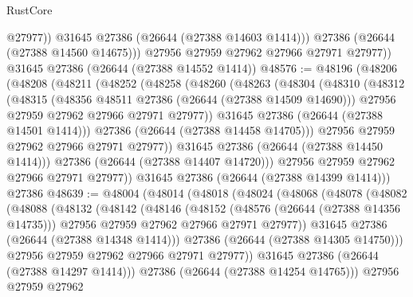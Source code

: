 \begin{lexlean}{RustCore}
\begin{coremodule}
                @27977))
            @31645
            @27386
            (@26644 (@27388 @14603 @1414)))
          @27386
          (@26644 (@27388 @14560 @14675)))
        @27956
        @27959
        @27962
        @27966
        @27971
        @27977))
    @31645
    @27386
    (@26644 (@27388 @14552 @1414))
@48576 := @48196
    (@48206
      (@48208
        (@48211
          (@48252
            (@48258
              (@48260
                (@48263
                  (@48304
                    (@48310
                      (@48312
                        (@48315
                          (@48356 @48511 @27386 (@26644 (@27388 @14509 @14690)))
                          @27956
                          @27959
                          @27962
                          @27966
                          @27971
                          @27977))
                      @31645
                      @27386
                      (@26644 (@27388 @14501 @1414)))
                    @27386
                    (@26644 (@27388 @14458 @14705)))
                  @27956
                  @27959
                  @27962
                  @27966
                  @27971
                  @27977))
              @31645
              @27386
              (@26644 (@27388 @14450 @1414)))
            @27386
            (@26644 (@27388 @14407 @14720)))
          @27956
          @27959
          @27962
          @27966
          @27971
          @27977))
      @31645
      @27386
      (@26644 (@27388 @14399 @1414)))
    @27386
@48639 := @48004
    (@48014
      (@48018
        (@48024
          (@48068
            (@48078
              (@48082
                (@48088
                  (@48132
                    (@48142
                      (@48146
                        (@48152
                          (@48576 (@26644 (@27388 @14356 @14735)))
                          @27956
                          @27959
                          @27962
                          @27966
                          @27971
                          @27977))
                      @31645
                      @27386
                      (@26644 (@27388 @14348 @1414)))
                    @27386
                    (@26644 (@27388 @14305 @14750)))
                  @27956
                  @27959
                  @27962
                  @27966
                  @27971
                  @27977))
              @31645
              @27386
              (@26644 (@27388 @14297 @1414)))
            @27386
            (@26644 (@27388 @14254 @14765)))
          @27956
          @27959
          @27962

\end{coremodule}
\end{lexlean}

